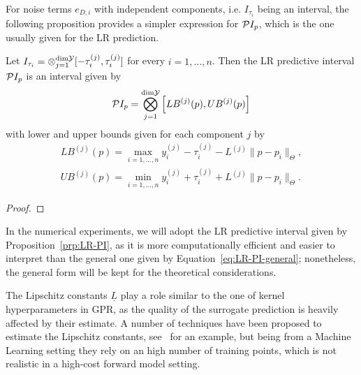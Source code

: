 For noise terms $e_{D,i}$ with independent components, i.e. $I_{\tau_i}$ being an interval, the following proposition provides a simpler expression for $\mathcal PI_p$, which is the one usually given for the LR prediction.
\begin{prp}\label{prp:LR-PI}
    Let $I_{\tau_i} = \otimes_{j=1}^{\text{dim}\mathcal Y} [ -\tau_i^{(j)}, \tau_i^{(j)} ]$ for every $i = 1, \dots, n$.
    Then the LR predictive interval $\mathcal PI_p$ is an interval given by
    \begin{equation}\label{eq:LR-PI}
        \mathcal PI_p = \bigotimes_{j=1}^{\text{dim}\mathcal Y} \left[ LB^{(j)}(p), UB^{(j)}(p)\right]
    \end{equation}
    with lower and upper bounds given for each component $j$ by
    \begin{equation} \label{LR-bounds}
    \begin{gathered}
        LB^{(j)}(p) = \max_{i=1,\dots,n} y_i^{(j)} - \tau_i^{(j)} - L^{(j)} \| p - p_i \|_\Theta, \\
        UB^{(j)}(p) = \min_{i=1,\dots,n} y_i^{(j)} + \tau_i^{(j)} + L^{(j)} \| p - p_i \|_\Theta.
    \end{gathered}
    \end{equation}
\end{prp}
\begin{proof}
\end{proof}

In the numerical experiments, we will adopt the LR predictive interval given by Proposition~\ref{prp:LR-PI}, as it is more computationally efficient and easier to interpret than the general one given by Equation~\eqref{eq:LR-PI-general}; nonetheless, the general form will be kept for the theoretical considerations. \medbreak

The Lipschitz constants $\underline L$ play a role similar to the one of kernel hyperparameters in GPR, as the quality of the surrogate prediction is heavily affected by their estimate.
A number of techniques have been proposed to estimate the Lipschitz constants, see~\cite{Calliess2017} for an example, but being from a Machine Learning setting they rely on an high number of training points, which is not realistic in a high-cost forward model setting.

